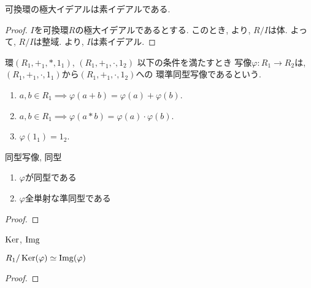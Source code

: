   \begin{theorem}
    可換環の極大イデアルは素イデアルである.
  \end{theorem}
  \begin{proof}
    $I$を可換環$R$の極大イデアルであるとする.
    このとき,
    より, $R/I$は体.
    よって, $R/I$は整域.
    より, $I$は素イデアル.
  \end{proof}

  \begin{definition}
    環$(R_1,+_1,\ast, 1_1)$, $(R_1,+_1,\cdot,1_2 )$
    以下の条件を満たすとき
    写像$\varphi\colon R_1 \to R_2$は,
    $(R_1,+_1,\cdot, 1_1)$から$(R_1,+_1,\cdot,1_2 )$への
    環準同型写像であるという.
    \begin{enumerate}
    \item $a,b\in R_1\implies \varphi(a+b)=\varphi(a)+\varphi(b)$.
    \item $a,b\in R_1\implies \varphi(a\ast b)=\varphi(a)\cdot\varphi(b)$.
    \item $\varphi(1_1)=1_2$.
    \end{enumerate}
  \end{definition}
  \begin{definition}
    同型写像, 同型
  \end{definition}
  \begin{proposition}
    \begin{enumerate}
    \item $\varphi$が同型である
    \item $\varphi$全単射な準同型である
    \end{enumerate}
  \end{proposition}
  \begin{proof}\end{proof}

  \begin{definition}
    $\operatorname{Ker}$, $\operatorname{Img}$
  \end{definition}
  \begin{theorem}
    $R_1/\operatorname{Ker}(\varphi)\simeq \operatorname{Img}(\varphi)$
  \end{theorem}
  \begin{proof}\end{proof}


